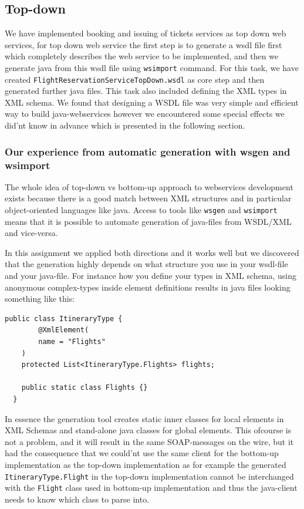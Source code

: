\documentclass[a4paper, 11pt]{article}
\begin{document}
\subsection*{Top-down}
We have implemented booking and issuing of tickets services as top down web services, for top down web service the first step is to generate a wsdl file first which completely describes the web service to be implemented, and then we generate java from this wsdl file using \texttt{wsimport} command. For this task, we have created \texttt{FlightReservationServiceTopDown.wsdl} as core step and then generated further java files. This task also included defining the XML types in XML schema. We found that designing a WSDL file was very simple and efficient way to build java-webservices however we encountered some special effects we did'nt know in advance which is presented in the following section.

\subsubsection*{Our experience from automatic generation with wsgen and wsimport}
The whole idea of top-down vs bottom-up approach to webservices development exists because there is a good match between XML structures and in particular object-oriented languages like java. Access to tools like \texttt{wsgen} and \texttt{wsimport} means that it is possible to automate generation of java-files from WSDL/XML and vice-versa.

In this assignment we applied both directions and it works well but we discovered that the generation highly depends on what structure you use in your wsdl-file and your java-file. For instance how you define your types in XML schema, using anonymous complex-types inside element definitions results in java files looking something like this:
\begin{lstlisting}[frame=single,style=java]
  public class ItineraryType {
        @XmlElement(
        name = "Flights"
    )
    protected List<ItineraryType.Flights> flights;

    public static class Flights {}
  }    
\end{lstlisting}
In essence the generation tool creates static inner classes for local elements in XML Schemas and stand-alone java classes for global elements. This ofcourse is not a problem, and it will result in the same SOAP-messages on the wire, 
but it had the consequence that we could'nt use the same client for the bottom-up implementation as the top-down implementation as for example the generated \texttt{ItineraryType.Flight} in the top-down implementation cannot be interchanged with the \texttt{Flight} class used in bottom-up implementation and thus the java-client needs to know which class to parse into. 
\end{document}

